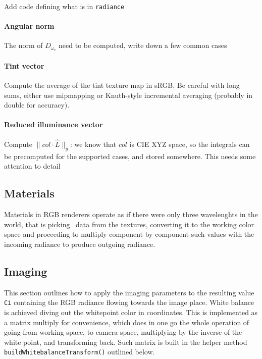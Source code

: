 \begin{inconstruction}
Add code defining what is in \Verb|radiance|

    \paragraph{Angular norm}

    The norm of $D_{\omega_c}$ need to be computed, write down a few common
    cases

    \paragraph{Tint vector}

    Compute the average of the tint texture map in \gls{sRGB}.
    Be careful with long sums, either use mipmapping or Knuth-style
    incremental averaging (probably in double for accuracy).

    \paragraph{Reduced illuminance vector}

    Compute $\|col\cdot \hat L\|_{\bar y}$: we know that $col$ is
    \gls{CIE} \gls{XYZ} space, so the integrals can be precomputed
    for the supported cases, and stored somewhere.
    This needs some attention to detail
\end{inconstruction}


\subsection{Materials}

Materials in \gls{RGB} renderers operate as if there were only three wavelenghts in
the world, that is picking \sRGBl\ data from the textures, converting it to the
working color space and proceeding to multiply component by component such values
with the incoming radiance to produce outgoing radiance.


\subsection{Imaging}

This section outlines how to apply the imaging parameters to the resulting value
\Verb|Ci| containing the \gls{RGB} radiance flowing towards the image place.
White balance is achieved diving out the whitepoint color in \camRGBl coordinates.
This is implemented as a matrix multiply for convenience, which does in one go
the whole operation of going from working space, to camera space, multiplying by
 the inverse of the white point, and transforming back. Such matrix is built in
 the helper method
\Verb|buildWhitebalanceTransform()| outlined below.


